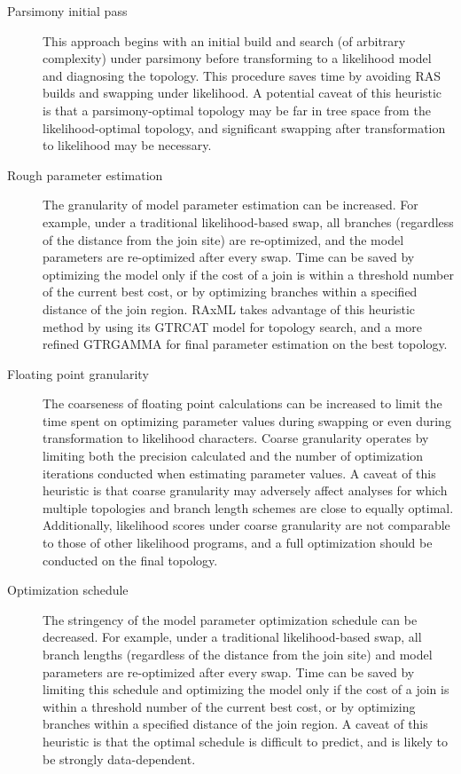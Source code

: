 \begin{description} 

\item[Parsimony initial pass] This approach
begins with an initial build and search (of arbitrary complexity)
under parsimony before transforming to a likelihood model and
diagnosing the topology. This procedure saves time by avoiding RAS
builds and swapping under likelihood. A potential caveat of this
heuristic is that a parsimony-optimal topology may be far in tree
space from the likelihood-optimal topology, and significant swapping
after transformation to likelihood may be necessary.

\item[Rough parameter estimation] The granularity of model parameter
estimation can be increased. For example, under a traditional
likelihood-based swap, all branches (regardless of the distance
from the join site) are re-optimized, and the model parameters are
re-optimized after every swap. Time can be saved by optimizing the
model only if the cost of a join is within a threshold number of
the current best cost, or by optimizing branches within a specified
distance of the join region. RAxML takes advantage of this heuristic
method by using its GTRCAT model for topology search, and a more
refined GTRGAMMA for final parameter estimation on the best topology.

\item[Floating point granularity] The coarseness of floating point
calculations can be increased to limit the time spent on optimizing
parameter values during swapping or even during transformation to
likelihood characters. Coarse granularity operates by limiting both
the precision calculated and the number of optimization iterations
conducted when estimating parameter values. A caveat of this heuristic
is that coarse granularity may adversely affect analyses for which
multiple topologies and branch length schemes are close to equally
optimal. Additionally, likelihood scores under coarse granularity
are not comparable to those of other likelihood programs, and a
full optimization should be conducted on the final topology.

\item[Optimization schedule] The stringency of the model parameter
optimization schedule can be decreased. For example, under a
traditional likelihood-based swap, all branch lengths (regardless
of the distance from the join site) and model parameters are
re-optimized after every swap. Time can be saved by limiting this
schedule and optimizing the model only if the cost of a join is
within a threshold number of the current best cost, or by optimizing
branches within a specified distance of the join region. A caveat
of this heuristic is that the optimal schedule is difficult to
predict, and is likely to be strongly data-dependent.


\end{description}
